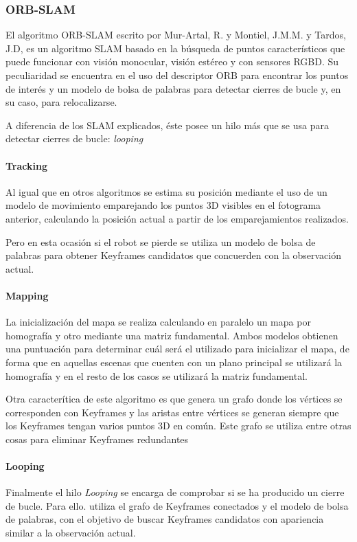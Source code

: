\documentclass{bmvc2k}
\begin{document}
\subsubsection{ORB-SLAM}
El algoritmo ORB-SLAM \cite{ORB-SLAM} escrito por Mur-Artal, R. y Montiel, J.M.M. y Tardos, J.D, es un algoritmo SLAM basado en la búsqueda de puntos característicos que puede funcionar con visión monocular, visión estéreo y con sensores RGBD. Su peculiaridad se encuentra en el uso del descriptor ORB \cite{ORB-descriptor} para encontrar los puntos de interés y un modelo de bolsa de palabras \cite{bolsa}  para detectar cierres de bucle y, en su caso, para relocalizarse.

A diferencia de los SLAM explicados, éste posee un hilo más que se usa para detectar cierres de bucle: \textit{looping}
\paragraph{Tracking}
Al igual que en otros algoritmos se estima su posición mediante el uso de un modelo de movimiento emparejando los puntos 3D visibles en el fotograma anterior, calculando la posición actual a partir de
los emparejamientos realizados.

Pero en esta ocasión si el robot se pierde se utiliza un modelo de bolsa de palabras para obtener Keyframes candidatos que concuerden con la observación actual.
\paragraph{Mapping}
La inicialización del mapa se realiza calculando en paralelo un mapa por homografía y otro mediante una matriz fundamental. Ambos modelos obtienen una puntuación para determinar cuál será el utilizado para inicializar el mapa, de forma que en aquellas escenas que cuenten con un plano principal se utilizará la homografía y en el resto de los casos se utilizará la matriz fundamental.



Otra caracterítica de este algoritmo es que genera un grafo donde los vértices se corresponden con Keyframes y las aristas entre vértices se generan siempre que los Keyframes tengan varios puntos 3D en común. Este grafo se utiliza entre otras cosas para eliminar Keyframes redundantes
\paragraph{Looping}
Finalmente el hilo \textit{Looping} se encarga de comprobar si se ha producido un cierre de bucle. Para ello. utiliza el grafo de Keyframes conectados y el modelo de bolsa de palabras, con el objetivo de buscar Keyframes candidatos con apariencia similar a la observación actual.

\end{document}

